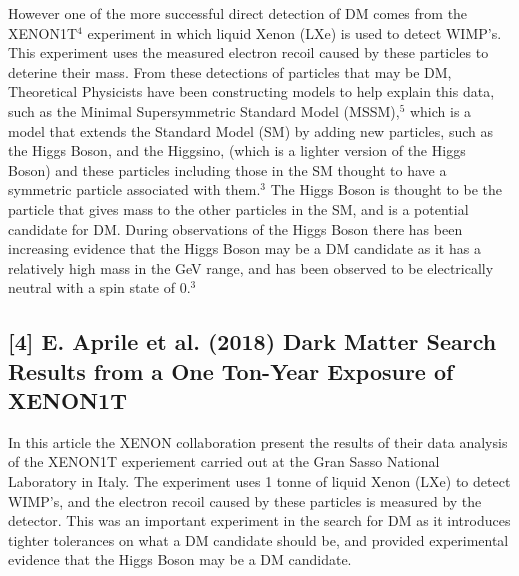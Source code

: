\documentclass[]{article}
\begin{document}
\parskip 0.2cm
However one of the more successful direct detection of DM comes from the 
XENON1T$^4$ experiment in which liquid Xenon (LXe) is used to detect WIMP's.
This experiment uses the measured electron recoil caused by these particles
to deterine their mass. 
\parskip 0.2cm
From these detections of particles that may be DM, Theoretical Physicists have
been constructing models to help explain this data, such as the Minimal Supersymmetric
Standard Model (MSSM),$^5$ which is a model that extends the Standard Model (SM) by
adding new particles, such as the Higgs Boson, and the Higgsino, (which is a
lighter version of the Higgs Boson) and these particles including those in the SM 
thought to have a symmetric particle associated with them.$^3$ The Higgs Boson is thought to be the particle
that gives mass to the other particles in the SM, and is a potential 
candidate for DM. During observations of the Higgs Boson there has been increasing
evidence that the Higgs Boson may be a DM candidate
as it has a relatively high mass in the GeV range, and has been observed
to be electrically neutral with a spin state of 0.$^3$
\parskip 0.2cm
\newpage
\noindent 
\subsection*{[4] E. Aprile et al. (2018) Dark Matter Search Results from a One Ton-Year Exposure of XENON1T}

\parskip 0.2cm
In this article the XENON collaboration present the results of their data analysis
of the XENON1T experiement carried out at the Gran Sasso National Laboratory in Italy.
The experiment uses  1 tonne of liquid Xenon (LXe) to detect WIMP's, and the 
electron recoil caused by these particles is measured by the detector. This was an 
important experiment in the search for DM as it introduces tighter tolerances on what 
a DM candidate should be, and provided experimental evidence that the Higgs Boson
may be a DM candidate.\parskip 0.2cm

\noindent 
\end{document}
